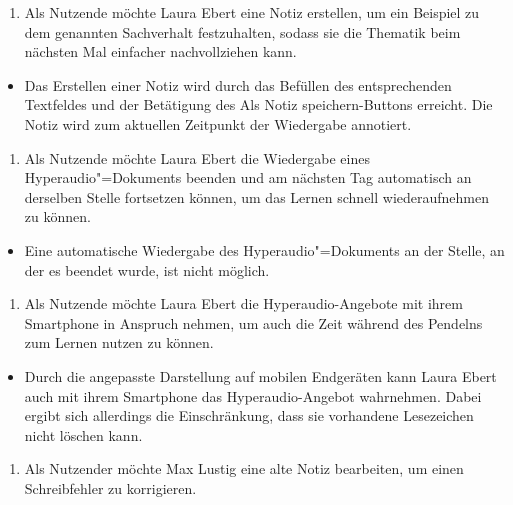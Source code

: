 \vspace{0.25cm}
\begin{enumerate}[resume*]
\item \label{US-Notiz-S-Eval} Als Nutzende möchte Laura Ebert eine Notiz erstellen, um ein Beispiel zu dem genannten Sachverhalt festzuhalten, sodass sie die Thematik beim nächsten Mal einfacher nachvollziehen kann.
\end{enumerate}
\begin{itemize}[resume*]
\item[\Checkmark]
Das Erstellen einer Notiz wird durch das Befüllen des entsprechenden Textfeldes und der Betätigung des \glqq Als Notiz speichern\grqq{}-Buttons erreicht. Die Notiz wird zum aktuellen Zeitpunkt der Wiedergabe annotiert.
\end{itemize}
\vspace{0.25cm}
\begin{enumerate}[resume*]
\item \label{US-Fortsetzen-Eval} Als Nutzende möchte Laura Ebert die Wiedergabe eines Hyperaudio"=Dokuments beenden und am nächsten Tag automatisch an derselben Stelle fortsetzen können, um das Lernen schnell wiederaufnehmen zu können.
\end{enumerate}
\begin{itemize}[resume*]
\item[\XSolidBrush]
Eine automatische Wiedergabe des Hyperaudio"=Dokuments an der Stelle, an der es beendet wurde, ist nicht möglich.
\end{itemize}
\vspace{0.25cm}
\begin{enumerate}[resume*]
\item \label{US-Mobil-Eval} Als Nutzende möchte Laura Ebert die Hyperaudio-Angebote mit ihrem Smartphone in Anspruch nehmen, um auch die Zeit während des Pendelns zum Lernen nutzen zu können.
\end{enumerate}
\begin{itemize}[resume*]
\item[\Asterisk]
Durch die angepasste Darstellung auf mobilen Endgeräten kann Laura Ebert auch mit ihrem Smartphone das Hyperaudio-Angebot wahrnehmen. Dabei ergibt sich allerdings die Einschränkung, dass sie vorhandene Lesezeichen nicht löschen kann.
\end{itemize}
\vspace{0.25cm}
\begin{enumerate}[resume*]
\item \label{US-Notiz-Bearbeiten-Eval} Als Nutzender möchte Max Lustig eine alte Notiz bearbeiten, um einen Schreibfehler zu korrigieren.
\end{enumerate}
